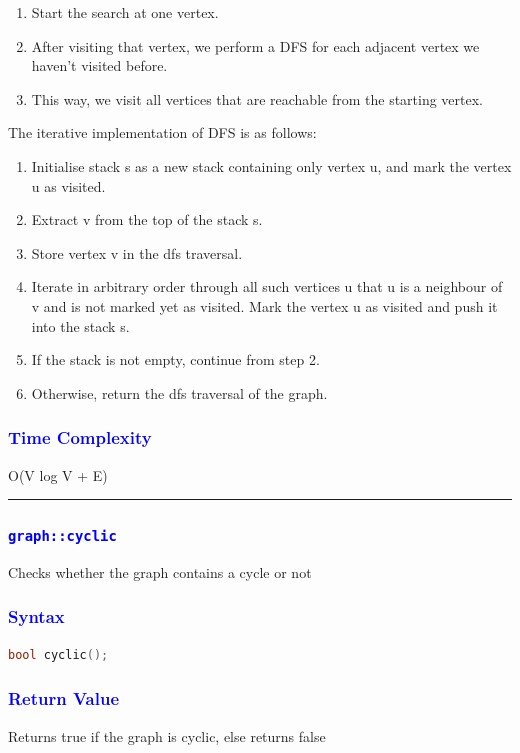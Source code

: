 \documentclass[11pt,a4paper]{article}
\begin{document}
\begin{enumerate}  
\item Start the search at one vertex.
\item After visiting that vertex, we perform a DFS for each adjacent vertex we haven't visited before.
\item This way, we visit all vertices that are reachable from the starting vertex.

\end{enumerate}  
The iterative implementation of DFS is as follows:
\begin{enumerate}  
\item Initialise stack s as a new stack containing only vertex u, and mark the vertex u as visited.
\item Extract v from the top of the stack s.

\item Store vertex v in the dfs traversal.
\item Iterate in arbitrary order through all such vertices u that u is a neighbour of v and is not marked yet as visited. Mark the vertex u as visited and push it into the stack s.
\item If the stack is not empty, continue from step 2.
\item Otherwise, return the dfs traversal of the graph.

\end{enumerate} 
\subsubsection*{\textcolor{blue}{ \large {Time Complexity}}}
O(V log V + E)
\\
\rule{17cm}{0.1mm}





\subsubsection*{\textcolor{blue}{\Large\texttt{graph::cyclic}}}
Checks whether the graph contains a cycle or not
\subsubsection*{\textcolor{blue}{ \large {Syntax}}}
\begin{lstlisting}[language=C++]
bool cyclic();
\end{lstlisting}
\subsubsection*{\textcolor{blue}{ \large {Return Value}}}
Returns true if the graph is cyclic, else returns false
\end{document}
